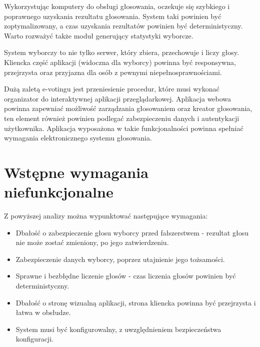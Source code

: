 \documentclass[a4paper,13pt]{report}
\begin{document}
Wykorzystując komputery do obsługi głosowania, oczekuje się szybkiego i poprawnego uzyskania rezultatu głosowania. System taki powinien być zoptymalizowany, a czas uzyskania rezultatów powinien być deterministyczny. Warto rozważyć także moduł generujący statystyki wyborcze.

System wyborczy to nie tylko serwer, który zbiera, przechowuje i liczy głosy. Kliencka część aplikacji (widoczna dla wyborcy) powinna być responsywna, przejrzysta oraz przyjazna dla osób z pewnymi niepełnosprawnościami.

Dużą zaletą e-votingu jest przeniesienie procedur, które musi wykonać organizator do interaktywnej aplikacji przeglądarkowej. Aplikacja webowa powinna zapewniać możliwość zarządzania głosowaniem oraz kreator głosowania, ten element również powinien podlegać zabezpieczeniu danych i autentykacji użytkownika. Aplikacja wyposażona w takie funkcjonalności powinna spełniać wymagania elektronicznego systemu głosowania.

\section{Wstępne wymagania niefunkcjonalne}
Z powyższej analizy można wypunktować następujące wymagania:
\begin{itemize}

\item Dbałość o zabezpieczenie głosu wyborcy przed fałszerstwem - rezultat głosu nie może zostać zmieniony, po jego zatwierdzeniu.

\item Zabezpieczenie danych wyborcy, poprzez utajnienie jego tożsamości.

\item Sprawne i bezbłędne liczenie głosów - czas liczenia głosów powinien być deterministyczny.

\item Dbałość o stronę wizualną aplikacji, strona kliencka powinna być przejrzysta i łatwa w obsłudze.

\item System musi być konfigurowalny, z uwzględnieniem bezpieczeństwa konfiguracji.
\end{itemize}
\end{document}
